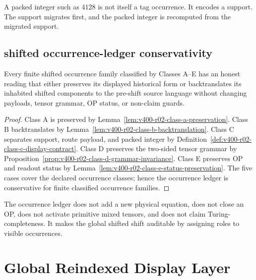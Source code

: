 \begin{remark}
\label{rem:v400-r02-packed-values-are-not-tags}
A packed integer such as $4128$ is not itself a tag occurrence. It encodes a
support. The support migrates first, and the packed integer is recomputed from
the migrated support.
\end{remark}

\subsection{shifted occurrence-ledger conservativity}
\label{subsec:v400-r02-occurrence-ledger-conservativity}

\begin{theorem}
\label{thm:v400-r02-occurrence-ledger-conservativity}
Every finite shifted occurrence family classified by Classes A--E has an honest
reading that either preserves its displayed historical form or backtranslates
its inhabited shifted components to the pre-shift source language without changing
payloads, tensor grammar, OP status, or non-claim guards.
\end{theorem}

\begin{proof}
Class A is preserved by Lemma~\ref{lem:v400-r02-class-a-preservation}. Class B
backtranslates by Lemma~\ref{lem:v400-r02-class-b-backtranslation}. Class C
separates support, route payload, and packed integer by
Definition~\ref{def:v400-r02-class-c-display-contract}. Class D preserves the
two-sided tensor grammar by Proposition~\ref{prop:v400-r02-class-d-grammar-invariance}.
Class E preserves OP and readout status by Lemma~\ref{lem:v400-r02-class-e-status-preservation}.
The five cases cover the declared occurrence classes; hence the occurrence
ledger is conservative for finite classified occurrence families.
\end{proof}

\begin{remark}
\label{rem:v400-r02-non-claim}
The occurrence ledger does not add a new physical equation, does not close
an OP, does not activate primitive mixed tensors, and does not claim
Turing-completeness. It makes the global shifted shift auditable by assigning
roles to visible occurrences.
\end{remark}



\clearpage
\section{Global Reindexed Display Layer}
\label{sec:v400-r03-global-reindexed-display-layer}

